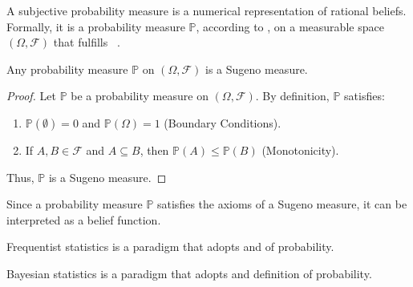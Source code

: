 \begin{definition}
	\label{def:subjective_probability}
	A subjective probability measure is a numerical representation of rational beliefs. Formally, it is a probability measure $\mathbb{P}$, according to , on a measurable space $(\Omega, \mathcal{F})$ that fulfills  ~\cite{shafer1987,hoff2009first}.
\end{definition}

\begin{theorem}
	Any probability measure $\mathbb{P}$ on $(\Omega, \mathcal{F})$ is a Sugeno measure.
\end{theorem}
\begin{proof}
	Let $\mathbb{P}$ be a probability measure on $(\Omega, \mathcal{F})$. By definition, $\mathbb{P}$ satisfies:
	\begin{enumerate}
		\item $\mathbb{P}(\emptyset) = 0$ and $\mathbb{P}(\Omega) = 1$ (Boundary Conditions).
		\item If $A, B \in \mathcal{F}$ and $A \subseteq B$, then $\mathbb{P}(A) \leq \mathbb{P}(B)$ (Monotonicity).
	\end{enumerate}
	Thus, $\mathbb{P}$ is a Sugeno measure.
\end{proof}

\begin{remark}
	Since a probability measure $\mathbb{P}$ satisfies the axioms of a Sugeno measure, it can be interpreted as a belief function.
\end{remark}


\begin{definition}
	\label{def:frequentist_statistics}
	Frequentist statistics is a	paradigm that adopts  and  of probability. 
\end{definition}

\begin{definition}
	\label{def:bayesian_statistics}
	Bayesian statistics is a paradigm that adopts  and definition  of probability. 
\end{definition}


